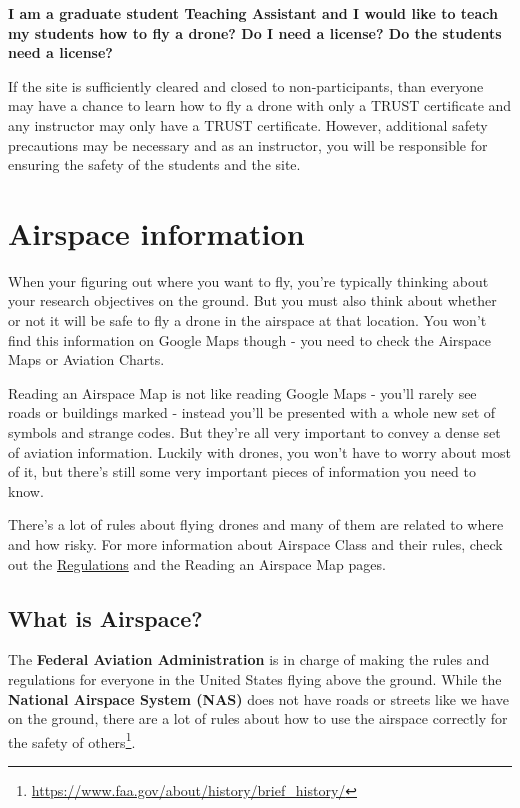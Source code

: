 \documentclass[
  12pt,
]{book}
\newenvironment{notebox}{
  \definecolor{shadecolor}{gray}{.8}  %
  \color{black}
  \begin{shaded}}
 {\end{shaded}}
\begin{document}
\textbf{I am a graduate student Teaching Assistant and I would like to teach my students how to fly a drone? Do I need a license? Do the students need a license?}

If the site is sufficiently cleared and closed to non-participants, than everyone may have a chance to learn how to fly a drone with only a TRUST certificate and any instructor may only have a TRUST certificate. However, additional safety precautions may be necessary and as an instructor, you will be responsible for ensuring the safety of the students and the site.

\chapter{Airspace information}\label{airspace-info}

When your figuring out where you want to fly, you're typically thinking about your research objectives on the ground. But you must also think about whether or not it will be safe to fly a drone in the airspace at that location. You won't find this information on Google Maps though - you need to check the Airspace Maps or Aviation Charts.

Reading an Airspace Map is not like reading Google Maps - you'll rarely see roads or buildings marked - instead you'll be presented with a whole new set of symbols and strange codes. But they're all very important to convey a dense set of aviation information. Luckily with drones, you won't have to worry about most of it, but there's still some very important pieces of information you need to know.

\begin{notebox}
There's a lot of rules about flying drones and many of them are related to where and how risky. For more information about Airspace Class and their rules, check out the \hyperref[regulations]{Regulations} and the Reading an Airspace Map pages.

\end{notebox}

\section{What is Airspace?}\label{what-is-airspace}

The \textbf{Federal Aviation Administration} is in charge of making the rules and regulations for everyone in the United States flying above the ground. While the \textbf{National Airspace System (NAS)} does not have roads or streets like we have on the ground, there are a lot of rules about how to use the airspace correctly for the safety of others\footnote{\url{https://www.faa.gov/about/history/brief_history/}}.
\end{document}
